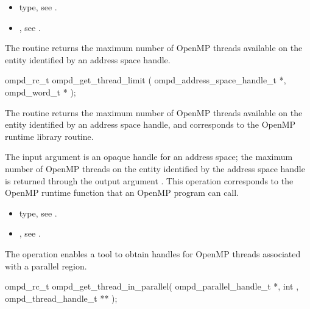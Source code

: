 \crossreferences	
\begin{itemize}
	\item {} type, see .
	\item {}, see .
\end{itemize}

\label{ompd:ompd_get_thread_limit}
\summary
The  routine returns the maximum
number of OpenMP threads available on the entity identified by
an address space handle.

\format

\cspecificstart
\begin{ompSyntax}
ompd_rc_t ompd_get_thread_limit (
  ompd_address_space_handle_t *,
  ompd_word_t *
);
\end{ompSyntax}
\cspecificend


\descr
The  routine returns the maximum
number of OpenMP threads available on the entity identified by
an address space handle, and corresponds to the  OpenMP
runtime library routine.

\argdesc
The input argument  is an opaque handle for an address space;
the maximum number of OpenMP threads on the entity identified by the
address space handle is returned through the output argument .
This operation corresponds to the OpenMP runtime function
 that an OpenMP program can call.

\crossreferences	
\begin{itemize}
	\item {} type, see .
	\item {}, see .
\end{itemize}



\label{ompd:ompd_get_thread_in_parallel}
\summary
The   operation enables a tool to obtain handles for 
OpenMP threads associated with a parallel region.

\format

\cspecificstart
\begin{ompSyntax}
ompd_rc_t ompd_get_thread_in_parallel(
  ompd_parallel_handle_t *,
  int ,
  ompd_thread_handle_t **
);
\end{ompSyntax}
\cspecificend


